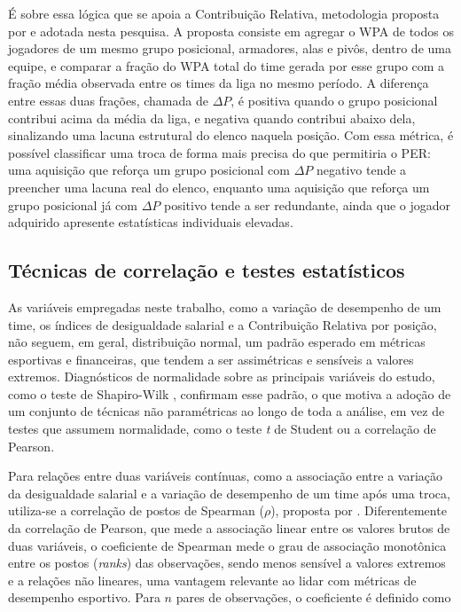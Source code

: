É sobre essa lógica que se apoia a Contribuição Relativa, metodologia proposta por \citet{sa2025} e adotada nesta pesquisa. A proposta consiste em agregar o WPA de todos os jogadores de um mesmo grupo posicional, armadores, alas e pivôs, dentro de uma equipe, e comparar a fração do WPA total do time gerada por esse grupo com a fração média observada entre os times da liga no mesmo período. A diferença entre essas duas frações, chamada de $\Delta P$, é positiva quando o grupo posicional contribui acima da média da liga, e negativa quando contribui abaixo dela, sinalizando uma lacuna estrutural do elenco naquela posição. Com essa métrica, é possível classificar uma troca de forma mais precisa do que permitiria o PER: uma aquisição que reforça um grupo posicional com $\Delta P$ negativo tende a preencher uma lacuna real do elenco, enquanto uma aquisição que reforça um grupo posicional já com $\Delta P$ positivo tende a ser redundante, ainda que o jogador adquirido apresente estatísticas individuais elevadas.

\subsection{Técnicas de correlação e testes estatísticos}
\label{sec:corr_techniques}

As variáveis empregadas neste trabalho, como a variação de desempenho de um time, os índices de desigualdade salarial e a Contribuição Relativa por posição, não seguem, em geral, distribuição normal, um padrão esperado em métricas esportivas e financeiras, que tendem a ser assimétricas e sensíveis a valores extremos. Diagnósticos de normalidade sobre as principais variáveis do estudo, como o teste de Shapiro-Wilk \citep{shapirowilk1965}, confirmam esse padrão, o que motiva a adoção de um conjunto de técnicas não paramétricas ao longo de toda a análise, em vez de testes que assumem normalidade, como o teste \textit{t} de Student ou a correlação de Pearson.

Para relações entre duas variáveis contínuas, como a associação entre a variação da desigualdade salarial e a variação de desempenho de um time após uma troca, utiliza-se a correlação de postos de Spearman ($\rho$), proposta por \citet{spearman1904}. Diferentemente da correlação de Pearson, que mede a associação linear entre os valores brutos de duas variáveis, o coeficiente de Spearman mede o grau de associação monotônica entre os postos (\textit{ranks}) das observações, sendo menos sensível a valores extremos e a relações não lineares, uma vantagem relevante ao lidar com métricas de desempenho esportivo. Para $n$ pares de observações, o coeficiente é definido como

